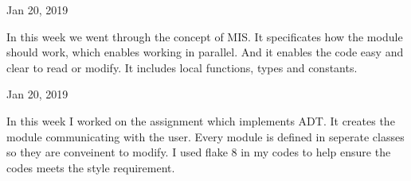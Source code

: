 \documentclass{article}
\begin{document}
\begin{flushleft}
Jan 20, 2019
\end{flushleft}
\par
In this week we went through the concept of MIS. It specificates how the module should work, which enables working in parallel. And it enables the code easy and clear to read or modify. It includes local functions, types and constants.

\begin{flushleft}
Jan 20, 2019
\end{flushleft}
\par
In this week I worked on the assignment which implements ADT. It creates the module communicating with the user. Every module is defined in seperate classes so they are conveinent to modify. I used flake 8 in my codes to help ensure the codes meets the style requirement. 
\end{document}
